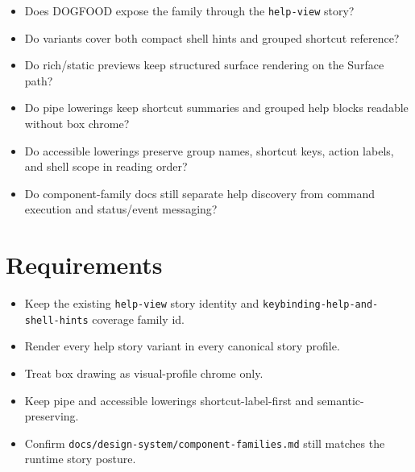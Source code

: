 \begin{itemize}
\tightlist
\item
  Does DOGFOOD expose the family through the \texttt{h\allowbreak{}e\allowbreak{}l\allowbreak{}p\allowbreak{}-\allowbreak{}v\allowbreak{}i\allowbreak{}e\allowbreak{}w} story?
\item
  Do variants cover both compact shell hints and grouped shortcut reference?
\item
  Do rich/static previews keep structured surface rendering on the Surface path?
\item
  Do pipe lowerings keep shortcut summaries and grouped help blocks readable without box chrome?
\item
  Do accessible lowerings preserve group names, shortcut keys, action labels, and shell scope in reading order?
\item
  Do component-family docs still separate help discovery from command execution and status/event messaging?
\end{itemize}

\section{Requirements}\label{record-105-requirements}

\begin{itemize}
\tightlist
\item
  Keep the existing \texttt{h\allowbreak{}e\allowbreak{}l\allowbreak{}p\allowbreak{}-\allowbreak{}v\allowbreak{}i\allowbreak{}e\allowbreak{}w} story identity and \texttt{k\allowbreak{}e\allowbreak{}y\allowbreak{}b\allowbreak{}i\allowbreak{}n\allowbreak{}d\allowbreak{}i\allowbreak{}n\allowbreak{}g\allowbreak{}-\allowbreak{}h\allowbreak{}e\allowbreak{}l\allowbreak{}p\allowbreak{}-\allowbreak{}a\allowbreak{}n\allowbreak{}d\allowbreak{}-\allowbreak{}s\allowbreak{}h\allowbreak{}e\allowbreak{}l\allowbreak{}l\allowbreak{}-\allowbreak{}h\allowbreak{}i\allowbreak{}n\allowbreak{}t\allowbreak{}s} coverage family id.
\item
  Render every help story variant in every canonical story profile.
\item
  Treat box drawing as visual-profile chrome only.
\item
  Keep pipe and accessible lowerings shortcut-label-first and semantic-preserving.
\item
  Confirm \texttt{d\allowbreak{}o\allowbreak{}c\allowbreak{}s\allowbreak{}/\allowbreak{}d\allowbreak{}e\allowbreak{}s\allowbreak{}i\allowbreak{}g\allowbreak{}n\allowbreak{}-\allowbreak{}s\allowbreak{}y\allowbreak{}s\allowbreak{}t\allowbreak{}e\allowbreak{}m\allowbreak{}/\allowbreak{}c\allowbreak{}o\allowbreak{}m\allowbreak{}p\allowbreak{}o\allowbreak{}n\allowbreak{}e\allowbreak{}n\allowbreak{}t\allowbreak{}-\allowbreak{}f\allowbreak{}a\allowbreak{}m\allowbreak{}i\allowbreak{}l\allowbreak{}i\allowbreak{}e\allowbreak{}s\allowbreak{}.\allowbreak{}m\allowbreak{}d} still matches the runtime story posture.
\end{itemize}

